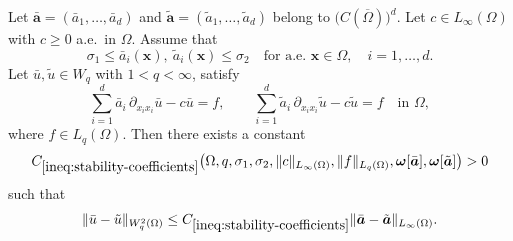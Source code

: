 \documentclass[final,onefignum,onetabnum]{mousaviart}
\begin{document}
	\begin{lemma}
		\label{lemma:stability-coefficients}
		Let 
		$\bar{\boldsymbol{a}} = (\bar{a}_1,\dots,\bar{a}_d)$ and 
		$\tilde{\boldsymbol{a}} = (\tilde{a}_1,\dots,\tilde{a}_d)$ belong to $\bigl(C(\overline{\Omega})\bigr)^d$. Let $c \in L_\infty(\Omega)$ with $c \ge 0$ a.e.\ in $\Omega$. Assume that
		\[
		\sigma_1 \le \bar{a}_i(\boldsymbol{x}),\ \tilde{a}_i(\boldsymbol{x}) \le \sigma_2
		\quad \text{for a.e.\ } \boldsymbol{x} \in \Omega,\quad i = 1,\dots,d.
		\]
		Let $\bar u, \tilde u \in W_q$ with $1 < q < \infty$, satisfy
		\begin{equation}
			\label{eq:linear-b}
			\sum_{i=1}^{d} \bar{a}_i\, \partial_{x_i x_i} \bar u - c \bar u = f,
			\qquad
			\sum_{i=1}^{d} \tilde{a}_i\, \partial_{x_i x_i} \tilde u - c \tilde u = f
			\quad \text{in } \Omega,
		\end{equation}
		where $f \in L_q(\Omega)$. Then there exists {\color{blue}a constant}
		\[
		C_{\ref{ineq:stability-coefficients}}
		\bigl(
		\Omega, q, \sigma_1, \sigma_2, \|c\|_{L_\infty(\Omega)},
		\|f\|_{L_q(\Omega)},
		\boldsymbol{\omega}[\bar{\boldsymbol{a}}],
		\boldsymbol{\omega}[\tilde{\boldsymbol{a}}]
		\bigr)>0
		\]
		such that
		\begin{equation}
			\label{ineq:stability-coefficients}
			\| \bar u - \tilde u \|_{W^{2}_q(\Omega)}
			\le
			C_{\ref{ineq:stability-coefficients}}
			\| \bar{\boldsymbol{a}} - \tilde{\boldsymbol{a}} \|_{L_\infty(\Omega)}.
		\end{equation}
	\end{lemma}
\end{document}

